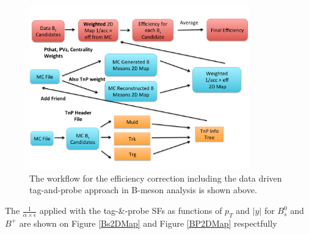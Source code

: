 \begin{figure}[h]
\begin{center}
\includegraphics[width= 0.85\textwidth]{Figures/Chapter4/EffCorrMethod.pdf}
\caption{The workflow for the efficiency correction including the data driven tag-and-probe approach in B-meson analysis is shown above.}
\label{EffWorkFlow}
\end{center}
\end{figure}

The $\frac{1}{\alpha \times \epsilon}$ applied with the tag-\&-probe SFs as functions of $p_T$ and $|y|$ for $B^0_s$ and $B^+$ are shown on Figure \ref{Bs2DMap} and Figure \ref{BP2DMap} respectfully 

